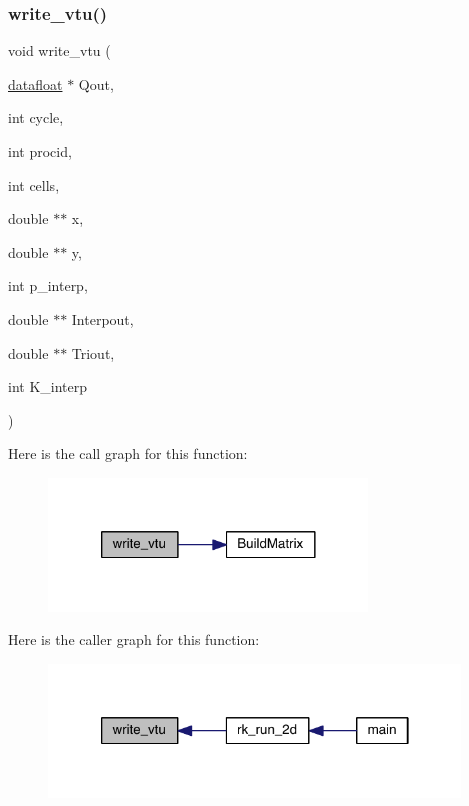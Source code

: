 \subsubsection{\texorpdfstring{write\+\_\+vtu()}{write\_vtu()}}
{\footnotesize\ttfamily void write\+\_\+vtu (\begin{DoxyParamCaption}\item[{\hyperlink{a00557_aa484d27c864c1a224505d8a302c0a4a4}{datafloat} $\ast$}]{Qout,  }\item[{int}]{cycle,  }\item[{int}]{procid,  }\item[{int}]{cells,  }\item[{double $\ast$$\ast$}]{x,  }\item[{double $\ast$$\ast$}]{y,  }\item[{int}]{p\+\_\+interp,  }\item[{double $\ast$$\ast$}]{Interpout,  }\item[{double $\ast$$\ast$}]{Triout,  }\item[{int}]{K\+\_\+interp }\end{DoxyParamCaption})}

Here is the call graph for this function\+:\nopagebreak
\begin{figure}[H]
\begin{center}
\leavevmode
\includegraphics[width=240pt]{a00554_aa275e5ac3935009592aad28f023ed4a1_cgraph}
\end{center}
\end{figure}
Here is the caller graph for this function\+:\nopagebreak
\begin{figure}[H]
\begin{center}
\leavevmode
\includegraphics[width=310pt]{a00554_aa275e5ac3935009592aad28f023ed4a1_icgraph}
\end{center}
\end{figure}
